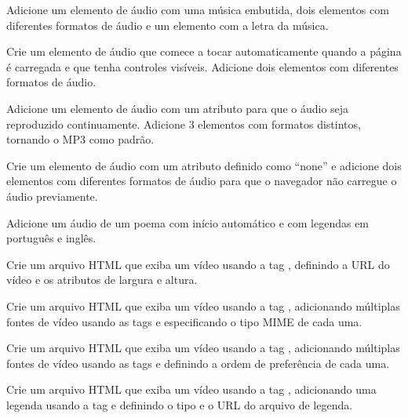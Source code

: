 \begin{exercise}
Adicione um elemento de áudio com uma música embutida, dois elementos  com diferentes formatos de áudio e um elemento  com a letra da música.
\end{exercise}

\begin{exercise}
Crie um elemento de áudio que comece a tocar automaticamente quando a página é carregada e que tenha controles visíveis. Adicione dois elementos  com diferentes formatos de áudio.
\end{exercise}

\begin{exercise}
Adicione um elemento de áudio com um atributo  para que o áudio seja reproduzido continuamente. Adicione 3 elementos  com formatos distintos, tornando o MP3 como padrão.
\end{exercise}

\begin{exercise}
Crie um elemento de áudio com um atributo  definido como ``none'' e adicione dois elementos  com diferentes formatos de áudio para que o navegador não carregue o áudio previamente.
\end{exercise}

\begin{exercise}
Adicione um áudio de um poema com início automático e com legendas em português e inglês. 
\end{exercise}

\begin{exercise}
Crie um arquivo HTML que exiba um vídeo usando a tag , definindo a URL do vídeo e os atributos de largura e altura.
\end{exercise}

\begin{exercise}
Crie um arquivo HTML que exiba um vídeo usando a tag , adicionando múltiplas fontes de vídeo usando as tags  e especificando o tipo MIME de cada uma.
\end{exercise}

\begin{exercise}
Crie um arquivo HTML que exiba um vídeo usando a tag , adicionando múltiplas fontes de vídeo usando as tags  e definindo a ordem de preferência de cada uma.
\end{exercise}

\begin{exercise}
Crie um arquivo HTML que exiba um vídeo usando a tag , adicionando uma legenda usando a tag  e definindo o tipo e o URL do arquivo de legenda.
\end{exercise}

